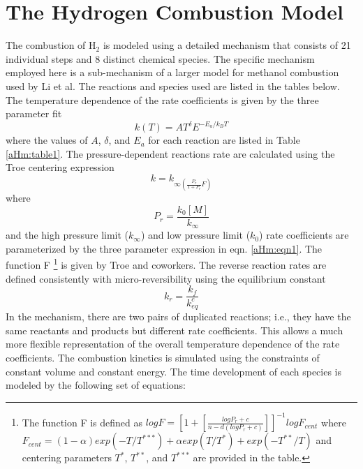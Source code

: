 \chapter{The Hydrogen Combustion Model}	%
\label{appendixC}
The combustion of H$_2$ is modeled using a detailed mechanism that consists of 21 individual steps and 8 distinct chemical species.  The specific mechanism employed here is a sub-mechanism of a larger model for methanol combustion used by Li et al.\cite{aHm_1_li2007comprehensive} The reactions and species used are listed in the tables below. The temperature dependence of the rate coefficients is given by the three parameter fit
\begin{equation}
\label{aHm:eqn1}
k(T) = AT^{\delta}E^{-E_a/{k_BT}}
\end{equation}
where the values of $A$, $\delta$, and $E_a$ for each reaction are listed in Table \ref{aHm:table1}.  The pressure-dependent reactions rate are calculated using the Troe centering expression
\begin{equation}
\label{aHm:eqn2}
k=k_{\infty \left( \frac{P_r}{1+P_r}F \right) }
\end{equation}
where
\begin{equation}
\label{aHm:eqn3}
P_r = \frac{k_0 \left[ M \right] }{k_{\infty}}
\end{equation}
and the high pressure limit ($k_{\infty}$) and low pressure limit ($k_0$) rate coefficients are parameterized by the three parameter expression in eqn. \ref{aHm:eqn1}.  The function F \footnote{\label{Fdef}  The function F is defined as $logF= {\left[  1+ \left[  \frac{logP_r + c}{n - d(logP_r+c)} \right] \right]}^{-1} logF_{cent} $ where $F_{cent} = (1-\alpha)exp(-T/T^{\ast\ast\ast})+\alpha exp(T/T^{\ast})+exp(-T^{\ast\ast}/T)$ and centering parameters $T^{\ast}$, $T^{\ast\ast}$, and $T^{\ast\ast\ast}$ are provided in the table.} is given by Troe and coworkers.\cite{aHm_2_gilbert1983theory} The reverse reaction rates are defined consistently with micro-reversibility using the equilibrium constant
\begin{equation}
\label{aHm:eqn4}
k_r = \frac{k_f}{k_{eq}^{c}}
\end{equation}
In the mechanism, there are two pairs of duplicated reactions; i.e., they have the same reactants and products but different rate coefficients. This allows a much more flexible representation of the overall temperature dependence of the rate coefficients.  
The combustion kinetics is simulated using the constraints of constant volume and constant energy.  The time development of each species is modeled by the following set of equations:

